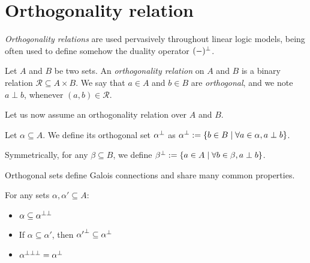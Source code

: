 \section{Orthogonality relation}\label{orthogonality-relation}

\emph{Orthogonality relations} are used pervasively throughout linear
logic models, being often used to define somehow the duality operator
\((-)^\bot\).

\begin{definition}
Let $A$ and $B$ be two sets. An \emph{orthogonality relation} on $A$ and $B$ is a binary relation $\mathcal{R}\subseteq A\times B$. We say that $a\in A$ and $b\in B$ are \emph{orthogonal}, and we note $a\perp b$, whenever $(a, b)\in\mathcal{R}$.
\end{definition}

Let us now assume an orthogonality relation over \(A\) and \(B\).

\begin{definition}
Let $\alpha\subseteq A$. We define its orthogonal set $\alpha^\bot$ as $\alpha^\bot:=\{b\in B \mid \forall a\in \alpha, a\perp b\}$.

Symmetrically, for any $\beta\subseteq B$, we define $\beta^\bot:=\{a\in A \mid \forall b\in \beta, a\perp b\}$.
\end{definition}

Orthogonal sets define Galois connections and share many common
properties.

\begin{proposition}
For any sets $\alpha, \alpha'\subseteq A$:
\begin{itemize}
\item $\alpha\subseteq \alpha^{\bot\bot}$
\item If $\alpha\subseteq\alpha'$, then ${\alpha'}^\bot\subseteq\alpha^\bot$
\item $\alpha^{\bot\bot\bot} = \alpha^\bot$
\end{itemize}
\end{proposition}

